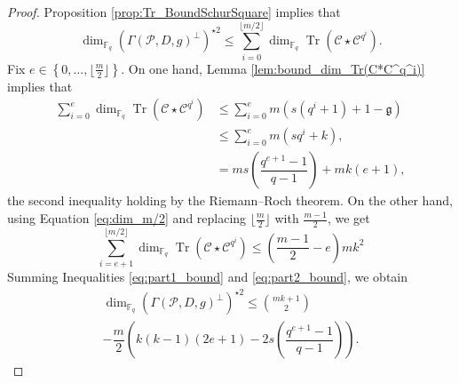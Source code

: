 \documentclass[lettersize,journal]{IEEEtran}
\theoremstyle{plain}
\theoremstyle{definition}
\theoremstyle{remark}
\DeclareMathOperator{\trace}{Tr}
\newcommand{\calP}{\mathcal{P}}
\newcommand{\calC}{\mathcal{C}}
\newcommand{\fq}{\mathbb{F}_{q}}
\newcommand{\Tr}[1]{\trace\!\left(#1\right)}
\newcommand{\set}[1]{\left\{#1\right\}}
\begin{document}
	\begin{proof}
		Proposition \ref{prop:Tr_BoundSchurSquare} implies that
\[			\dim_{\fq}(\Gamma(\calP,D,g)^{\perp})^{\star 2} \leq \sum\limits_{i=0}^{\lfloor m/2 \rfloor} \dim_{\fq} \Tr{\calC \star \calC^{q^i}}.
\]
Fix $e \in \set{0,\dots,\lfloor \frac{m}{2} \rfloor}$. On one hand, Lemma \ref{lem:bound_dim_Tr(C*C^q^i)} implies that
\begin{equation}\label{eq:part1_bound}
\begin{aligned}
	\sum\limits_{i=0}^{e} \dim_{\fq} \Tr{\calC \star \calC^{q^i}} 	& \leq \sum\limits_{i=0}^{e} m(s(q^i+1)+1-\mathfrak{g}) \\
																	& \leq \sum\limits_{i=0}^{e} m(sq^i+k),\\
																	&= ms\left(\dfrac{q^{e+1}-1}{q-1}\right)+mk(e+1),
\end{aligned}
\end{equation}
 the second inequality holding by the Riemann--Roch theorem. On the other hand, using Equation \eqref{eq:dim_m/2} and replacing $\lfloor \frac{m}{2} \rfloor$ with $\frac{m-1}{2}$, we get
\begin{equation}\label{eq:part2_bound}
	\sum\limits_{i=e+1}^{\lfloor m/2 \rfloor} \dim_{\fq} \Tr{\calC \star \calC^{q^i}} \leq \left( \frac{m-1}{2} -e \right)mk^2
\end{equation}
Summing Inequalities \eqref{eq:part1_bound} and \eqref{eq:part2_bound}, we obtain
\begin{multline}
		\dim_{\fq}(\Gamma(\calP,D,g)^{\perp})^{\star 2} \leq  \binom{mk+1}{2} \\-  \dfrac{m}{2}\left(k(k-1)(2e+1)-2s\left(\dfrac{q^{e+1}-1}{q-1}\right)\right).
\end{multline}

\end{proof}
\end{document}
